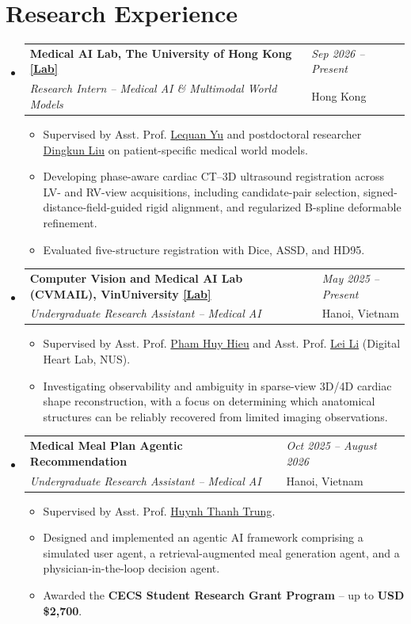 \documentclass[a4paper,10pt]{article}
\makeatletter
\newcommand{\resumeHeading}[4]{%
  \begin{tabularx}{\textwidth}[t]{%
    @{}>{\raggedright\arraybackslash}X
    >{\raggedleft\arraybackslash}p{0.24\textwidth}@{}%
  }
    \textbf{#1} & \textit{#2} \\
    \textit{#3} & #4
  \end{tabularx}%
}
\newcommand{\smalllink}[2]{\href{#1}{\textcolor{linkblue}{#2}}}
\makeatother
\begin{document}
\section{Research Experience}
\begin{itemize}
    \item \resumeHeading
        {Medical AI Lab, The University of Hong Kong \smalllink{https://hku-medai.github.io/}{[Lab]}}
        {Sep 2026 -- Present}
        {Research Intern -- Medical AI \& Multimodal World Models}
        {Hong Kong}
        \begin{itemize}
          \item Supervised by Asst. Prof. \href{https://yulequan.github.io/}{Lequan Yu} and postdoctoral researcher \href{https://scholar.google.com/citations?user=PqeKHIAAAAAJ\&hl=zh-CN}{Dingkun Liu} on patient-specific medical world models.
          \item Developing phase-aware cardiac CT--3D ultrasound registration across LV- and RV-view acquisitions, including candidate-pair selection, signed-distance-field-guided rigid alignment, and regularized B-spline deformable refinement.
          \item Evaluated five-structure registration with Dice, ASSD, and HD95.
        \end{itemize}
    
  \item \resumeHeading
    {Computer Vision and Medical AI Lab (CVMAIL), VinUniversity \smalllink{https://cvlab.vinuni.edu.vn/}{[Lab]}}
    {May 2025 -- Present}
    {Undergraduate Research Assistant -- Medical AI}
    {Hanoi, Vietnam}
    \begin{itemize}
      \item Supervised by Asst. Prof. \href{https://vinuni.edu.vn/vi/people/ts-pham-huy-hieu/}{Pham Huy Hieu} and Asst. Prof. \href{https://scholar.google.com/citations?hl=en&user=--CYiuwAAAAJ}{Lei Li} (Digital Heart Lab, NUS).
      \item Investigating observability and ambiguity in sparse-view 3D/4D cardiac shape reconstruction, with a focus on determining which anatomical structures can be reliably recovered from limited imaging observations.
    \end{itemize}

  \item \resumeHeading
    {Medical Meal Plan Agentic Recommendation}
    {Oct 2025 -- August 2026}
    {Undergraduate Research Assistant -- Medical AI}
    {Hanoi, Vietnam}
    \begin{itemize}
      \item Supervised by Asst. Prof. \href{https://vinuni.edu.vn/people/huynh-thanh-trung/}{Huynh Thanh Trung}.
      \item Designed and implemented an agentic AI framework comprising a simulated user agent, a retrieval-augmented meal generation agent, and a physician-in-the-loop decision agent.
      \item Awarded the \textbf{CECS Student Research Grant Program} -- up to \textbf{USD \$2,700}.
    \end{itemize}


\end{itemize}
\end{document}
